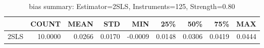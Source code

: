 \begin{table}[ht]
\centering
\caption{bias summary: Estimator=2SLS, Instruments=125, Strength=0.80}
\begin{tabular}{lrrrrrrrr}
\toprule
 & COUNT & MEAN & STD & MIN & 25\% & 50\% & 75\% & MAX \\
\midrule
2SLS & 10.0000 & 0.0266 & 0.0170 & -0.0009 & 0.0148 & 0.0306 & 0.0419 & 0.0444 \\
\bottomrule
\end{tabular}
\end{table}
